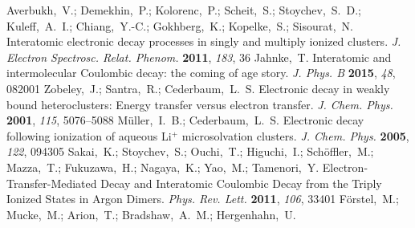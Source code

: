 \documentclass[journal=jpccck,manuscript=article]{achemso}
\begin{document}
\begin{mcitethebibliography}{73}
\EndOfBibitem
{}
Averbukh,~V.; Demekhin,~P.; Kolorenc,~P.; Scheit,~S.; Stoychev,~S.~D.;
  Kuleff,~A.~I.; Chiang,~Y.-C.; Gokhberg,~K.; Kopelke,~S.; Sisourat,~N.
    Interatomic electronic decay processes in singly and multiply
  ionized clusters. \emph{J. Electron Spectrosc. Relat. Phenom.} \textbf{2011},
  \emph{183}, 36\relax
\mciteBstWouldAddEndPuncttrue
\mciteSetBstMidEndSepPunct{\mcitedefaultmidpunct}
{\mcitedefaultendpunct}{\mcitedefaultseppunct}\relax
\EndOfBibitem
{}
Jahnke,~T. Interatomic and intermolecular Coulombic decay: the coming of age
  story. \emph{J. Phys. B} \textbf{2015}, \emph{48}, 082001\relax
\mciteBstWouldAddEndPuncttrue
\mciteSetBstMidEndSepPunct{\mcitedefaultmidpunct}
{\mcitedefaultendpunct}{\mcitedefaultseppunct}\relax
\EndOfBibitem
{}
Zobeley,~J.; Santra,~R.; Cederbaum,~L.~S. Electronic decay in weakly bound
  heteroclusters: Energy transfer versus electron transfer. \emph{J. Chem.
  Phys.} \textbf{2001}, \emph{115}, 5076--5088\relax
\mciteBstWouldAddEndPuncttrue
\mciteSetBstMidEndSepPunct{\mcitedefaultmidpunct}
{\mcitedefaultendpunct}{\mcitedefaultseppunct}\relax
\EndOfBibitem
{}
M\"uller,~I.~B.; Cederbaum,~L.~S. Electronic decay following ionization of
  aqueous Li$^+$ microsolvation clusters. \emph{J. Chem. Phys.} \textbf{2005},
  \emph{122}, 094305\relax
\mciteBstWouldAddEndPuncttrue
\mciteSetBstMidEndSepPunct{\mcitedefaultmidpunct}
{\mcitedefaultendpunct}{\mcitedefaultseppunct}\relax
\EndOfBibitem
{}
Sakai,~K.; Stoychev,~S.; Ouchi,~T.; Higuchi,~I.; Sch\"offler,~M.; Mazza,~T.;
  Fukuzawa,~H.; Nagaya,~K.; Yao,~M.; Tamenori,~Y. 
  Electron-Transfer-Mediated Decay and Interatomic Coulombic Decay from the
  Triply Ionized States in Argon Dimers. \emph{Phys. Rev. Lett.} \textbf{2011},
  \emph{106}, 33401\relax
\mciteBstWouldAddEndPuncttrue
\mciteSetBstMidEndSepPunct{\mcitedefaultmidpunct}
{\mcitedefaultendpunct}{\mcitedefaultseppunct}\relax
\EndOfBibitem
{}
F\"orstel,~M.; Mucke,~M.; Arion,~T.; Bradshaw,~A.~M.; Hergenhahn,~U.

\end{mcitethebibliography}
\end{document}
